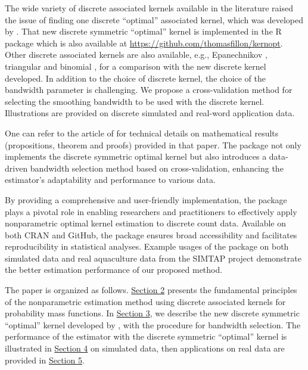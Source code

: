 The wide variety of discrete associated kernels available in the literature raised the issue of finding one discrete ``optimal'' associated kernel, which was developed by \citet{SengaDurrieu2024}. That new discrete symmetric ``optimal'' kernel is implemented in the R package  which is also available at \url{https://github.com/thomasfillon/kernopt}. Other discrete associated kernels are also available, e.g., Epanechnikov \citep{chu2017}, triangular and binomial \citep{Wansouwe2016}, for a comparison with the new discrete kernel developed. In addition to the choice of discrete kernel, the choice of the bandwidth parameter is challenging. We propose a cross-validation method for selecting the smoothing bandwidth to be used with the discrete kernel. Illustrations are provided on discrete simulated and real-word application data.

One can refer to the article of \citet{SengaDurrieu2024} for technical details on mathematical results (propositions, theorem and proofs) provided in that paper.
The  package not only implements the discrete symmetric optimal kernel but also introduces a data-driven bandwidth selection method based on cross-validation, enhancing the estimator's adaptability and performance to various data.

By providing a comprehensive and user-friendly implementation, the  package plays a pivotal role in enabling researchers and practitioners to effectively apply nonparametric optimal kernel estimation to discrete count data. Available on both CRAN and GitHub, the package ensures broad accessibility and facilitates reproducibility in statistical analyses. Example usages of the package on both simulated data and real aquaculture data from the SIMTAP project demonstrate the better estimation performance of our proposed method.

The paper is organized as follows. \hyperref[sec2-nonparametric-kernel-estimation]{Section 2} presents the fundamental principles of the nonparametric estimation method using discrete associated kernels for probability mass functions. In \hyperref[sec3-optimal-kernel]{Section 3}, we describe the new discrete symmetric ``optimal'' kernel developed by \citet{SengaDurrieu2024}, with the procedure for bandwidth selection. The performance of the estimator with the discrete symmetric ``optimal'' kernel is illustrated in \hyperref[sec4-presentation-simu]{Section 4} on simulated data, then applications on real data are provided in \hyperref[sec5-application-real-data]{Section 5}.

